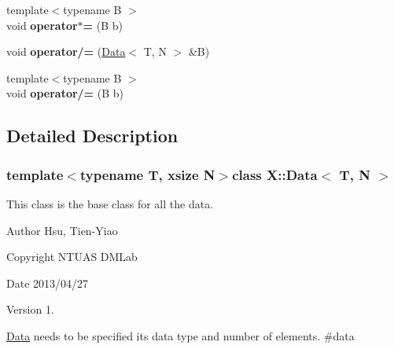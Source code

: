\begin{DoxyCompactItemize}
\item 
\hypertarget{class_x_1_1_data_a3460e08914f4d7337ae106c291cf6818}{{\footnotesize template$<$typename B $>$ }\\void {\bfseries operator$\ast$=} (B b)}\label{class_x_1_1_data_a3460e08914f4d7337ae106c291cf6818}

\item 
\hypertarget{class_x_1_1_data_a3279d56933969537c5f12ff0a60c55a1}{void {\bfseries operator/=} (\hyperlink{class_x_1_1_data}{Data}$<$ T, N $>$ \&B)}\label{class_x_1_1_data_a3279d56933969537c5f12ff0a60c55a1}

\item 
\hypertarget{class_x_1_1_data_a78a26985cb6596c9d9e475f54887bbe3}{{\footnotesize template$<$typename B $>$ }\\void {\bfseries operator/=} (B b)}\label{class_x_1_1_data_a78a26985cb6596c9d9e475f54887bbe3}

\end{DoxyCompactItemize}


\subsection{Detailed Description}
\subsubsection*{template$<$typename T, xsize N$>$class X\-::\-Data$<$ T, N $>$}

This class is the base class for all the data. 

\begin{DoxyAuthor}{Author}
Hsu, Tien-\/\-Yiao 
\end{DoxyAuthor}
\begin{DoxyCopyright}{Copyright}
N\-T\-U\-A\-S D\-M\-Lab 
\end{DoxyCopyright}
\begin{DoxyDate}{Date}
2013/04/27 
\end{DoxyDate}
\begin{DoxyVersion}{Version}
1.
\end{DoxyVersion}
\hyperlink{class_x_1_1_data}{Data} needs to be specified its data type and number of elements. \#data 

